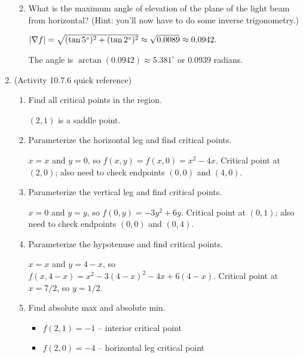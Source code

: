 \begin{enumerate}[leftmargin=0pt]
\begin{enumerate}
\begin{red}
        \end{red}
        \item What is the maximum angle of elevation of the plane of the light beam from horizontal? (Hint: you'll now have to do some inverse trigonometry.) 
        
        \begin{red}$|\nabla f| = \sqrt{(\tan 5^\circ)^2 + (\tan 2^\circ)^2} \approx \sqrt{0.0089} \approx 0.0942.$ 
            
            The angle is $\arctan(0.0942) \approx 5.381^\circ$ or $0.0939$ radians.
        \end{red}
    \end{enumerate}

    \item (Activity 10.7.6 quick reference)
    \begin{enumerate}
        \item Find all critical points in the region. \begin{red}$(2,1)$ is a saddle point. \end{red}
        \item Parameterize the horizontal leg and find critical points.
        \begin{red}
            $x=x$ and $y=0$, so $f(x,y) = f(x,0) = x^2-4x$. Critical point at $(2,0)$; also need to check endpoints $(0,0)$ and $(4,0)$.
        \end{red}
        \item Parameterize the vertical leg and find critical points.
        \begin{red}
            $x=0$ and $y=y$, so $f(0, y) = -3y^2+6y$. Critical point at $(0, 1)$; also need to check endpoints $(0,0)$ and $(0, 4)$.
        \end{red}
        \item Parameterize the hypotenuse and find critical points.
        \begin{red}
            $x=x$ and $y=4-x$, so $f(x, 4-x) = x^2 -3(4-x)^2-4x+6(4-x)$. Critical point at $x=7/2$, so $y=1/2$.
        \end{red}
        \item Find absolute max and absolute min.
        \begin{red}
            \begin{itemize}
                \item $f(2,1) = -1$ -- interior critical point
                \item $f(2,0) = -4$ -- horizontal leg critical point

\end{itemize}
\end{red}
\end{enumerate}
\end{enumerate}
